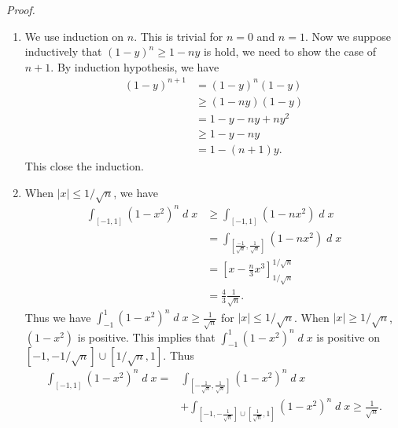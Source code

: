 \documentclass{book}
\DeclareMathOperator{\dd}{\mathit{d}}%
\newcommand{\pff}{\vspace{.25em}\noindent\emph{Proof.}~~}
\begin{document}
\pff
\begin{enumerate}
    \item We use induction on $n$. This is trivial for $n = 0$ and $n = 1$. Now we suppose inductively that $(1 - y)^n \geq 1 - ny$ is hold, we need to show the case of $n + 1$. By induction hypothesis, we have
        \begin{align*}
            (1 - y)^{n + 1}
            &= (1 - y)^{n}(1 - y)\\
            &\geq (1 - ny)(1 - y)\\
            &= 1 - y - ny + ny^2\\
            &\geq 1 - y - ny\\
            &= 1 - (n + 1)y.
        \end{align*}
    This close the induction.

    \item When $|x| \leq 1/\sqrt{n}$, we have
        \begin{align*}
            \int_{[-1, 1]} (1 - x^2)^n \dd x
            &\geq \int_{[-1, 1]} (1 - nx^2) \dd x\\
            &= \int_{\left[\frac{-1}{\sqrt{n}}, \frac{1}{\sqrt{n}}\right]} (1 - nx^2) \dd x\\
            &= \left[x - \frac{n}{3}x^3\right]_{1/\sqrt{n}}^{1/\sqrt{n}}\\
            &= \frac{4}{3}\frac{1}{\sqrt{n}}.
        \end{align*}
    Thus we have $\int_{-1}^{1} (1 - x^2)^n \dd x \geq \frac{1}{\sqrt{n}}$ for $|x| \leq 1/\sqrt{n}$. When $|x| \geq 1/\sqrt{n}$, $(1 - x^2)$ is positive. This implies that $\int_{-1}^{1} (1 - x^2)^n \dd x$ is positive on $[-1, -1/\sqrt{n}] \cup [1/\sqrt{n}, 1]$. Thus
        \begin{align*}
            \int_{[-1, 1]} (1 - x^2)^n \dd x
            =& \int_{\left[-\frac{1}{\sqrt{n}}, \frac{1}{\sqrt{n}}\right]} (1 - x^2)^n \dd x\\
            &+ \int_{\left[-1, -\frac{1}{\sqrt{n}}\right] \cup \left[\frac{1}{\sqrt{n}}, 1\right]} (1 - x^2)^n \dd x
            \geq \frac{1}{\sqrt{n}}.
        \end{align*}


\end{enumerate}
\end{document}
